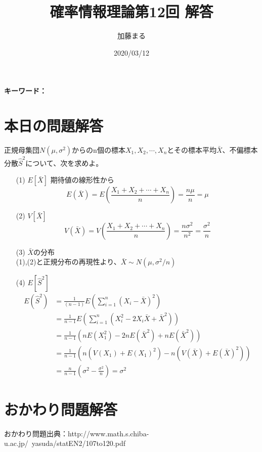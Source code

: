 \documentclass[a4j,uplatex,dvipdfmx]{jsarticle}
\title{確率情報理論第12回 解答}
\author{加藤まる}
\date{2020/03/12}
\begin{document}
\maketitle
\bf キーワード：
\rm

\section*{本日の問題解答}
正規母集団$N(\mu ,\sigma ^2)$からのn個の標本$X_1,X_2,\cdots ,X_n$とその標本平均$\bar{X}$、不偏標本分散$\hat{S}^2$について、次を求めよ。
\begin{itemize}
  \item[(1)] $E[\bar{X}]$
  期待値の線形性から
  \begin{equation}
    E(\bar{X})=E\left( \frac{X_1+X_2+\cdots +X_n}{n} \right) = \frac{n\mu}{n}=\mu
  \end{equation} 
  \item[(2)] $V[\bar{X}]$
  \begin{equation}
    V(\bar{X})=V\left( \frac{X_1+X_2+\cdots+X_n}{n} \right) = \frac{n\sigma ^2}{n^2}=\frac{\sigma ^2}{n}
  \end{equation} 
  \item[(3)] $\bar{X}$の分布\\
  (1),(2)と正規分布の再現性より、$\bar{X}\sim N(\mu,\sigma ^2/n)$
  \item[(4)] $E[\hat{S}^2]$   
  \begin{equation}
    \begin{split}
      E(\hat{S}^2) &=\frac{1}{(n-1)}E\left( \sum_{i=1}^n (X_i-\bar{X})^2 \right) \\ 
      &= \frac{1}{n-1}E\left( \sum_{i=1}^n (X_i^2 - 2X_i\bar{X} + \bar{X}^2) \right) \\
      &= \frac{1}{n-1}(nE(X_1^2)-2nE(\bar{X}^2)+nE(\bar{X}^2))\\
      &= \frac{1}{n-1}(n(V(X_1)+E(X_1)^2)-n(V(\bar{X})+E(\bar{X})^2))\\
      &= \frac{n}{n-1}\left( \sigma ^2 - \frac{\sigma ^2}{n} \right) = \sigma ^2
    \end{split}
  \end{equation} 
\end{itemize}

\section*{おかわり問題解答}
おかわり問題出典：http://www.math.s.chiba-u.ac.jp/~yasuda/statEN2/107to120.pdf \\ \\
\end{document}
